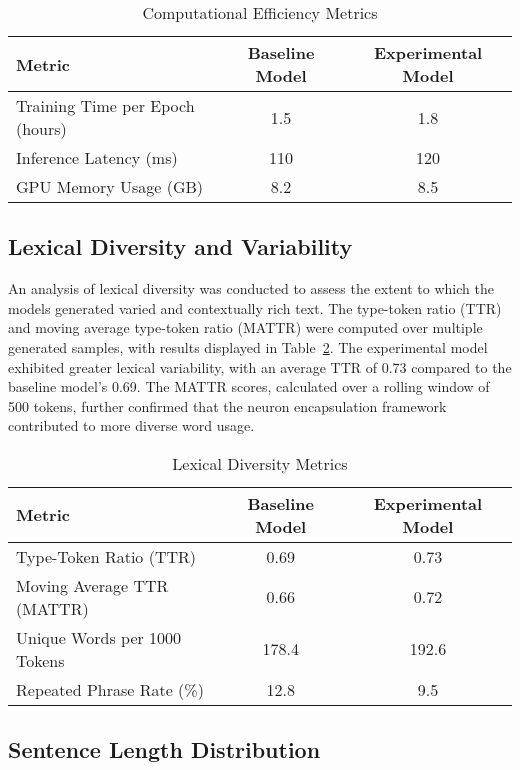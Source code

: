 \documentclass{article}
\begin{document}
\begin{table}[h]
	\centering
	\caption{Computational Efficiency Metrics}
	\label{tab:efficiency}
		\begin{tabular}{|l|c|c|}
			\hline
			\textbf{Metric} & \textbf{Baseline Model} & \textbf{Experimental Model} \\
			\hline
			Training Time per Epoch (hours) & 1.5 & 1.8 \\
			Inference Latency (ms) & 110 & 120 \\
			GPU Memory Usage (GB) & 8.2 & 8.5 \\
			\hline
		\end{tabular}
\end{table}



\subsection{Lexical Diversity and Variability}

An analysis of lexical diversity was conducted to assess the extent to which the models generated varied and contextually rich text. The type-token ratio (TTR) and moving average type-token ratio (MATTR) were computed over multiple generated samples, with results displayed in Table~\ref{tab:lexical_diversity}. The experimental model exhibited greater lexical variability, with an average TTR of 0.73 compared to the baseline model's 0.69. The MATTR scores, calculated over a rolling window of 500 tokens, further confirmed that the neuron encapsulation framework contributed to more diverse word usage.

\begin{table}[h]
	\centering
	\caption{Lexical Diversity Metrics}
	\label{tab:lexical_diversity}
		\begin{tabular}{|l|c|c|}
			\hline
			\textbf{Metric} & \textbf{Baseline Model} & \textbf{Experimental Model} \\
			\hline
			Type-Token Ratio (TTR) & 0.69 & 0.73 \\
			Moving Average TTR (MATTR) & 0.66 & 0.72 \\
			Unique Words per 1000 Tokens & 178.4 & 192.6 \\
			Repeated Phrase Rate (\%) & 12.8 & 9.5 \\
			\hline
		\end{tabular}
\end{table}

\subsection{Sentence Length Distribution}
\end{document}

